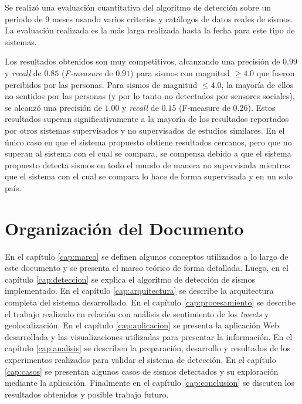 Se realizó una evaluación cuantitativa del algoritmo de detección sobre un periodo de 9 meses usando varios criterios y catálogos de datos reales de sismos. 
%
La evaluación realizada es la más larga realizada hasta la fecha para este tipo de sistemas.


Los resultados obtenidos son muy competitivos, alcanzando una precisión de $0.99$ y \textit{recall} de $0.85$ (\textit{F-measure} de $0.91$) para sismos con magnitud $\geq 4.0$ que fueron percibidos por las personas. 
%
Para sismos de magnitud $\leq 4.0$, la mayoría de ellos no sentidos por las personas (y por lo tanto no detectados por sensores sociales), se alcanzó una precisión de $1.00$ y \textit{recall} de $0.15$ (F-measure de $0.26$).
%
Estos resultados superan significativamente a la mayoría de los resultados reportados por otros sistemas supervisados y no supervisados de estudios similares.
%
En el único caso en que el sistema propuesto obtiene resultados cercanos, pero que no superan al sistema con el cual se compara, se compensa debido a que el sistema propuesto detecta sismos en todo el mundo de manera no supervisada mientras que el sistema con el cual se compara lo hace de forma supervisada y en un solo país.


\section{Organización del Documento}

En el capítulo \ref{cap:marco} se definen algunos conceptos utilizados a lo largo de este documento y se presenta el marco teórico de forma detallada. 
%
Luego, en el capítulo \ref{cap:deteccion} se explica el algoritmo de detección de sismos implementado. 
%
En el capítulo \ref{cap:arquitectura} se describe la arquitectura completa del sistema desarrollado. 
%
En el capítulo \ref{cap:procesamiento} se describe el trabajo realizado en relación con análisis de sentimiento de los \textit{tweets} y geolocalización. 
% 
En el capítulo \ref{cap:aplicacion} se presenta la aplicación Web desarrollada y las visualizaciones utilizadas para presentar la información. 
%
En el capítulo \ref{cap:analisis} se describen la preparación, desarrollo y resultados de los experimentos realizados para validar el sistema de detección. 
%
En el capítulo \ref{cap:casos} se presentan algunos casos de sismos detectados y su exploración mediante la aplicación.
%
Finalmente en el capítulo \ref{cap:conclusion} se discuten los resultados obtenidos y posible trabajo futuro.  